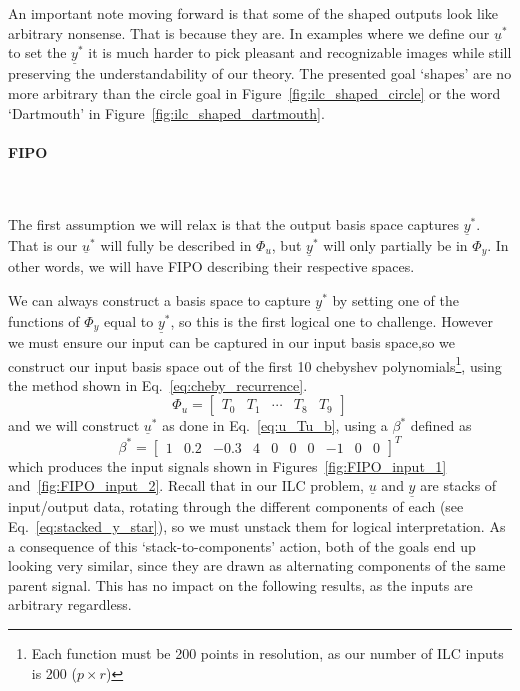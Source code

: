 An important note moving forward is that some of the shaped outputs look like arbitrary nonsense. That is because they are. In examples where we define our $\underline{u}^\ast$ to set the $\underline{y}^\ast$ it is much harder to pick pleasant and recognizable images while still preserving the understandability of our theory. The presented goal `shapes' are no more arbitrary than the circle goal in Figure~\ref{fig:ilc_shaped_circle} or the word `Dartmouth' in Figure~\ref{fig:ilc_shaped_dartmouth}. 

\FloatBarrier\paragraph{{FIPO}}
~\label{par:fipo}

The first assumption we will relax is that the output basis space captures $\underline{y}^\ast$. That is our $\underline{u}^\ast$ will fully be described in $\Phi_u$, but $\underline{y}^\ast$ will only partially be in $\Phi_y$. In other words, we will have \ac{FIPO} describing their respective spaces.

We can always construct a basis space to capture $\underline{y}^\ast$ by setting one of the functions of $\Phi_y$ equal to $\underline{y}^\ast$, so this is the first logical one to challenge. However we must ensure our input can be captured in our input basis space,so we construct our input basis space out of the first 10 chebyshev polynomials\footnote{Each function must be 200 points in resolution,  as our number of ILC inputs is 200 ($p \times r$)}, using the method shown in Eq.~\ref{eq:cheby_recurrence}.
\begin{equation}
    \Phi_u = 
    \begin{bmatrix}
        T_0 & T_1 & \cdots & T_8 & T_9
    \end{bmatrix}
    \label{eq:Tu_in_cheby}
\end{equation}
and we will construct $\underline{u}^\ast$ as done in Eq.~\ref{eq:u_Tu_b}, using a $\beta^\ast$ defined as
\begin{equation}
    \beta^\ast = {\begin{bmatrix}1 & 0.2 & -0.3 & 4 & 0 & 0 & 0 & -1 & 0 & 0\end{bmatrix}}^T
    \label{eq:beta_star_in_basis}
\end{equation}
which produces the input signals shown in Figures~\ref{fig:FIPO_input_1} and~\ref{fig:FIPO_input_2}. Recall that in our ILC problem, $\underline{u}$ and $\underline{y}$ are stacks of input/output data, rotating through the different components of each (see Eq.~\ref{eq:stacked_y_star}), so we must unstack them for logical interpretation. As a consequence of this `stack-to-components' action, both of the goals end up looking very similar, since they are drawn as alternating components of the same parent signal. This has no impact on the following results, as the inputs are arbitrary regardless.


